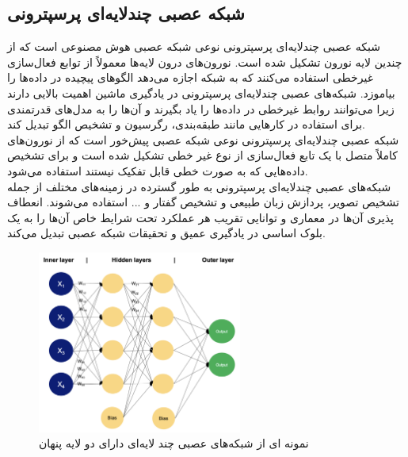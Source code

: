 \subsection{شبکه عصبی  چندلایه‌ای پرسپترونی}
شبکه عصبی  چندلایه‌ای پرسپترونی  نوعی شبکه عصبی  هوش مصنوعی است که از چندین لایه نورون تشکیل شده است. نورون‌های درون لایه‌ها معمولاً از
توابع فعال‌سازی غیرخطی  استفاده می‌کنند که به شبکه اجازه می‌دهد الگوهای پیچیده در داده‌ها را بیاموزد. شبکه‌های عصبی چندلایه‌ای پرسپترونی در 
یادگیری ماشین اهمیت بالایی دارند زیرا می‌توانند روابط غیرخطی در داده‌ها را یاد بگیرند و آن‌ها را به مدل‌های قدرتمندی برای استفاده در کارهایی مانند طبقه‌بندی، رگرسیون و تشخیص الگو تبدیل کند. 
\\
شبکه عصبی چندلایه‌ای پرسپترونی نوعی شبکه عصبی پیش‌خور است که از نورون‌های کاملاً متصل با یک تابع فعال‌سازی از نوع غیر خطی تشکیل شده است و  برای تشخیص داده‌هایی که به صورت خطی قابل تفکیک نیستند استفاده می‌شود.
\\
شبکه‌های عصبی چندلایه‌ای پرسپترونی به طور گسترده در زمینه‌های مختلف از جمله تشخیص تصویر، پردازش زبان طبیعی و تشخیص گفتار و ... استفاده می‌شوند. انعطاف پذیری آن‌ها در
معماری و توانایی تقریب هر عملکرد تحت شرایط خاص آن‌ها را به یک بلوک اساسی در یادگیری عمیق و تحقیقات شبکه عصبی تبدیل می‌کند. 

\begin{figure}[h]
    \centering
    \includegraphics[width=0.6\textwidth]{MLP.png}
    \caption[نمونه ای از شبکه‌های عصبی چند لایه‌ای دارای دو لایه پنهان]{نمونه ای از شبکه‌های عصبی چند لایه‌ای دارای دو لایه پنهان\cite{Multilay58:online}}
\end{figure}



